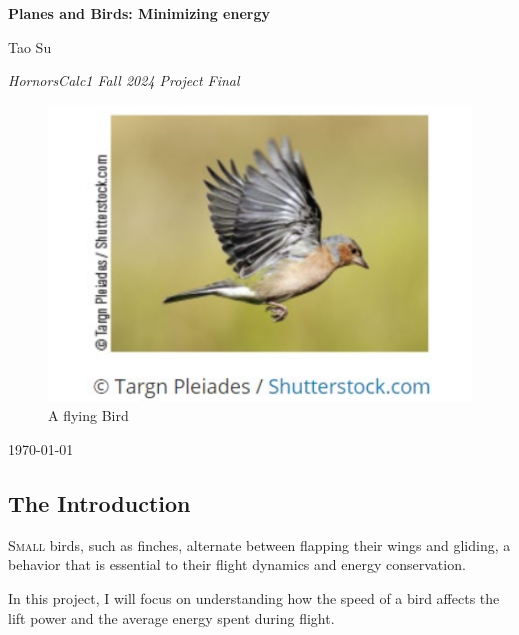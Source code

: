 \documentclass{article}
\begin{document}
\begin{titlepage}
    \centering
    \vspace*{1cm}
    
    \Huge
    \textbf{Planes and Birds: Minimizing energy}
    
    \vspace{0.5cm}
    
    \Large
    Tao Su
    \vspace{1.5cm}

    \large 
    \textit{HornorsCalc1 Fall 2024 Project Final}
    \vfill

    \begin{figure}[h]
        \centering
        \includegraphics[width=1\textwidth]{coverPage.png}
        \caption{\small A flying Bird}
        \label{fig:cover}
    \end{figure}
            
    \Large
    \today  %
    
\end{titlepage}

\newpage

\subsection*{The Introduction}

\lettrine[lines=2]{S}{mall} birds, such as finches, alternate between flapping their wings and gliding, a behavior that is essential to their flight dynamics and energy conservation.

In this project, I will focus on understanding how the speed of a bird affects the lift power and the average energy spent during flight.
\end{document}
